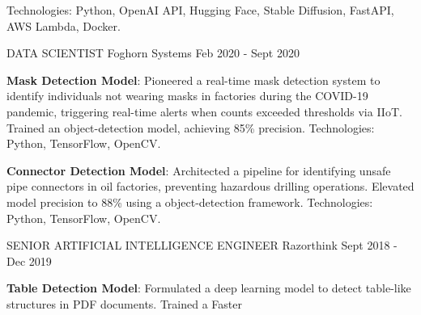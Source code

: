 \begin{cventries}
{\begin{cvitems}
{      \newline
      Technologies: Python, OpenAI API, Hugging Face, Stable Diffusion, FastAPI, AWS Lambda, Docker.}
	\end{cvitems}
    }
\vspace{2em} %
  \cventry
    {DATA SCIENTIST} %
    {Foghorn Systems} %
    {} %
    {Feb 2020 - Sept 2020} %
    {
      \begin{cvitems} %
        \item{\textbf{Mask Detection Model}: \newline 
        Pioneered a real-time mask detection system to identify individuals not wearing masks in factories during the COVID-19 pandemic, triggering 
        real-time alerts when counts exceeded thresholds via IIoT. \newline
        Trained an  object-detection model, 
        achieving 85\% precision. \newline Technologies: Python, TensorFlow, OpenCV.}        
        \item{\textbf{Connector Detection Model}: \newline Architected a pipeline for identifying unsafe pipe connectors in oil factories, preventing 
        hazardous drilling operations. \newline
        Elevated model precision to 88\% using a  object-detection framework. \newline
        Technologies: Python, TensorFlow, OpenCV.}
	\end{cvitems}
    }
\vspace{2em} %
  \cventry
    {SENIOR ARTIFICIAL INTELLIGENCE ENGINEER} %
    {Razorthink} %
    {} %
    {Sept 2018 - Dec 2019} %
    {
      \begin{cvitems} %
        \item{\textbf{Table Detection Model}: Formulated a deep learning model to 
        detect table-like structures in PDF documents. \newline Trained a Faster 
}
\end{cvitems}}
\end{cventries}
